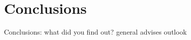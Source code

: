 
\chapter{Conclusions} %

\label{Chapter5} %



Conclusions:
what did you find out?
general advises
outlook